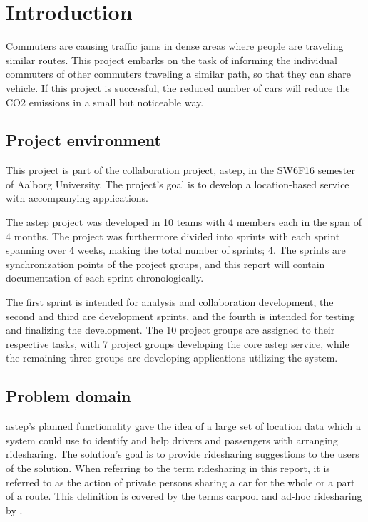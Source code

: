 \chapter{Introduction}\label{ch:introduction}


Commuters are causing traffic jams in dense areas where people are traveling similar routes. 
This project embarks on the task of informing the individual commuters of other commuters traveling a similar path, so that they can share vehicle.
If this project is successful, the reduced number of cars will reduce the CO2 emissions in a small but noticeable way.

\section{Project environment}
This project is part of the collaboration project, \gls{astep}, in the SW6F16 semester of Aalborg University.
The project's goal is to develop a location-based service with accompanying applications. 

The \gls{astep} project was developed in 10 teams with 4 members each in the span of 4 months.
The project was furthermore divided into sprints with each sprint spanning over 4 weeks, making the total number of sprints; 4.
The sprints are synchronization points of the project groups, and this report will contain documentation of each sprint chronologically.

The first sprint is intended for analysis and collaboration development, the second and third are development sprints, and the fourth is intended for testing and finalizing the development.
The 10 project groups are assigned to their respective tasks, with 7 project groups developing the core \gls{astep} service, while the remaining three groups are developing applications utilizing the system.

\section{Problem domain}
\gls{astep}'s planned functionality gave the idea of a large set of location data which a system could use to identify and help drivers and passengers with arranging ridesharing.
The solution's goal is to provide ridesharing suggestions to the users of the solution.
When referring to the term ridesharing in this report, it is referred to as the action of private persons sharing a car for the whole or a part of a route. 
This definition is covered by the terms carpool and ad-hoc ridesharing by \citet{doi:10.1080/01441647.2011.621557}.  

